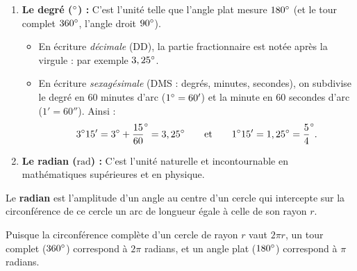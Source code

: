 \begin{enumerate}
    \item \textbf{Le degré ($\degree$) :} C'est l'unité telle que l'angle plat mesure $180\degree$ (et le tour complet $360\degree$, l'angle droit $90\degree$).
    \begin{itemize}
        \item En écriture \emph{décimale} (DD), la partie fractionnaire est notée après la virgule : par exemple $3,25\degree$.
        \item En écriture \emph{sexagésimale} (DMS : degrés, minutes, secondes), on subdivise le degré en $60$ minutes d'arc ($1\degree = 60'$) et la minute en $60$ secondes d'arc ($1' = 60''$). Ainsi :
        \[
            3\degree 15' = 3\degree + \frac{15}{60}\degree = 3,25\degree \qquad \text{et} \qquad 1\degree 15' = 1,25\degree = \frac{5}{4}\degree.
        \]
    \end{itemize}

    \item \textbf{Le radian ($\text{rad}$) :} C'est l'unité naturelle et incontournable en mathématiques supérieures et en physique.
\end{enumerate}

\begin{definition}[Le radian]
Le \textbf{radian} est l'amplitude d'un angle au centre d'un cercle qui intercepte sur la circonférence de ce cercle un arc de longueur égale à celle de son rayon $r$.
\end{definition}

\begin{center}
\end{center}

Puisque la circonférence complète d'un cercle de rayon $r$ vaut $2\pi r$, un tour complet ($360\degree$) correspond à $2\pi$ radians, et un angle plat ($180\degree$) correspond à $\pi$ radians.

